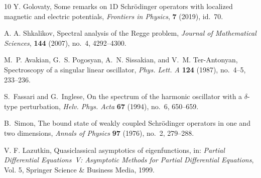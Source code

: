 \documentclass[reqno]{amsart}
\theoremstyle{definition}
\theoremstyle{remark}
\numberwithin{equation}{section}
\begin{document}
\begin{thebibliography}{10}
    Y. Golovaty,
    Some remarks on 1D Schr\"odinger operators with localized magnetic and electric potentials,
    \textit{Frontiers in Physics}, \textbf{7} (2019), id.~70.

    A. A. Shkalikov,
    Spectral analysis of the Regge problem,
    \textit{Journal of Mathematical Sciences}, \textbf{144} (2007), no.~4, 4292--4300.

M.~P. Avakian, G.~S. Pogosyan, A.~N. Sissakian, and V.~M. Ter-Antonyan,
Spectroscopy of a singular linear oscillator,
\textit{Phys. Lett. A} \textbf{124} (1987), no.~4--5, 233--236.

S.~Fassari and G.~Inglese,
On the spectrum of the harmonic oscillator with a $\delta$-type perturbation,
\textit{Helv. Phys. Acta} \textbf{67} (1994), no.~6, 650--659.


    B.~Simon,
    The bound state of weakly coupled Schr\"odinger operators in one and two dimensions,
    \textit{Annals of Physics} \textbf{97} (1976), no.~2, 279--288.

    V. F. Lazutkin,
    Quasiclassical asymptotics of eigenfunctions, in:
    \textit{Partial Differential Equations~V: Asymptotic Methods for Partial Differential Equations},
    Vol. 5, Springer Science \& Business Media, 1999.



\end{thebibliography}
\end{document}
